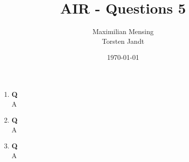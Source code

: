 \documentclass[a4paper,headsepline,12pt]{scrartcl}
\title{AIR - Questions 5}
\date{\today}
\author{Maximilian Mensing\\Torsten Jandt}
\begin{document}
\maketitle

\begin{enumerate}
    \item \textbf{Q} \\
    A
    \item \textbf{Q} \\
    A
    \item \textbf{Q} \\
    A
\end{enumerate}
\end{document}
